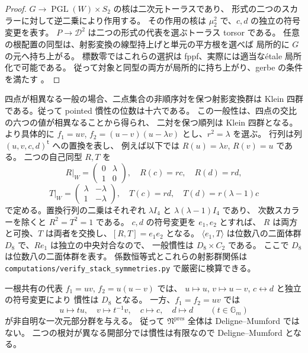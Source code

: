\begin{proof}
$G\to\operatorname{PGL}(W)\times S_2$ の核は二次元トーラスであり、
形式の二つのスカラーに対して逆二乗により作用する。
その作用の核は $\mu_2^2$ で、$c,d$ の独立の符号変更を表す。
$P\to\mathcal D^2$ は二つの形式の代表を選ぶトーラス torsor である。
任意の根配置の同型は、射影変換の線型持上げと単元の平方根を選べば
局所的に $G$ の元へ持ち上がる。
標数零ではこれらの選択は fppf、実際には適当な\'etale 局所化で可能である。
従って対象と同型の両方が局所的に持ち上がり、gerbe の条件を満たす
\cite[Tag 06PD]{StacksModuli}。
\end{proof}

\begin{example}
四点が相異なる一般の場合、二点集合の非順序対を保つ射影変換群は
Klein 四群である。従って pointed 慣性の位数は十六である。
この一般性は、四点の交比の六つの値が相異なることから得られ、
二対を保つ順列は Klein 四群となる。
より具体的に $f_1=uv$, $f_2=(u-v)(u-\lambda v)$ とし、$r^2=\lambda$ を選ぶ。
行列は列 $(u,v,c,d)^{\mathsf t}$ への置換を表し、
例えば以下では $R(u)=\lambda v$, $R(v)=u$ である。
二つの自己同型 $R,T$ を
\[
 R|_W=\begin{pmatrix}0&\lambda\\1&0\end{pmatrix},\quad
 R(c)=rc,\quad R(d)=rd,
\]
\[
 T|_W=\begin{pmatrix}\lambda&-\lambda\\1&-\lambda\end{pmatrix},\quad
 T(c)=rd,\quad T(d)=r(\lambda-1)c
\]
で定める。置換行列の二乗はそれぞれ $\lambda I_4$ と $\lambda(\lambda-1)I_4$ であり、
次数スカラーを除くと $R^2=T^2=1$ である。
$c,d$ の符号変更を $e_1,e_2$ とすれば、
$R$ は両方と可換、$T$ は両者を交換し、$[R,T]=e_1e_2$ となる。
$\langle e_1,T\rangle$ は位数八の二面体群 $D_8$ で、$Re_1$ は独立の中央対合なので、
一般慣性は $D_8\times C_2$ である。
ここで $D_8$ は位数八の二面体群を表す。
係数恒等式とこれらの射影群関係は
\texttt{computations/verify\_stack\_symmetries.py} で厳密に検算できる。

一根共有の代表 $f_1=uv$, $f_2=u(u-v)$ では、
$u\mapsto u$, $v\mapsto u-v$, $c\leftrightarrow d$ と独立の符号変更により
慣性は $D_8$ となる。
一方、$f_1=f_2=uv$ では
\[
 u\mapsto t u,\quad v\mapsto t^{-1}v,\quad c\mapsto c,\quad d\mapsto d
 \qquad(t\in\mathbb G_m)
\]
が非自明な一次元部分群を与える。
従って $\mathfrak N^{\mathrm{pres}}$ 全体は Deligne--Mumford ではない。
二つの根対が異なる開部分では慣性は有限なので Deligne--Mumford となる。
\end{example}

